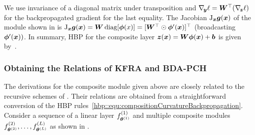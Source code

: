 We use invariance of a diagonal matrix under transposition and $\nabla_{\!{{\bm{y}}}}\ell =
{\bm{W}}^\top (\nabla_{\!{{\bm{z}}}}\ell)$ for the backpropagated gradient for the last
equality. The Jacobian $\mathrm{J}_{{\bm{x}}} {\bm{g}}({\bm{x}})$ of the module shown in
 is $\mathrm{J}_{{\bm{x}}}{\bm{g}}({\bm{x}}) = {\bm{W}} \operatorname{diag} [ {\bm{\phi}}(x) ]
= [ {\bm{W}}^\top \odot {\bm{\phi}}'({\bm{x}}) ]^\top$ (broadcasting ${\bm{\phi}}'({\bm{x}}))$. In summary,
HBP for the composite layer ${\bm{z}}({\bm{x}}) = {\bm{W}} {\bm{\phi}}({\bm{x}})+ {\bm{b}}$ is given
by~.

\subsubsection{Obtaining the Relations of KFRA and BDA-PCH}

The derivations for the composite module given above are closely related to the
recursive schemes of \citet{botev2017practical,wei2018bdapch}. Their relations
are obtained from a straightforward conversion of the HBP
rules~\eqref{hbp::equ:compositionCurvatureBackpropagation}. Consider a sequence
of a linear layer $f_{{\bm{\theta}}^{(1)}}^{(1)}$ and multiple composite modules
$f_{{\bm{\theta}}^{(2)}}^{(2)}, \dots, f_{{\bm{\theta}}^{(L)}}^{(L)}$ as shown in
.

